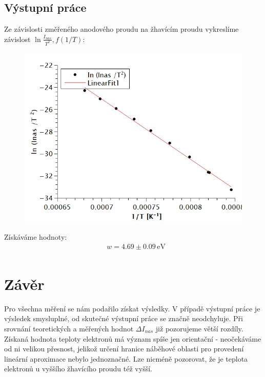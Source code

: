 \documentclass[czech,11pt,a4paper]{article}
\begin{document}
\begin{multicols}{2}
		\subsection{Výstupní práce}
		Ze závislosti změřeného anodového proudu na žhavícím proudu vykreslíme závislost $\ln \frac{I_{nas}}{T^2}, f(1/T)$:
			\begin{figure}[H]
			\centering
			\includegraphics[width=0.7\linewidth]{vystupniprace}
		\end{figure}
		Získáváme hodnoty:
		\begin{align*}
			& w = 4.69 \pm 0.09 \,\mathrm{eV}\\
		\end{align*}
		\section{Závěr}
		Pro všechna měření se nám podařilo získat výsledky. V případě výstupní práce je výsledek smysluplné, od skutečné výstupní práce se značně neodchyluje. Při srovnání teoretických a měřených hodnot $\Delta I_{nas}$ již pozorujeme větší rozdíly. \\ Získaná hodnota teploty elektronů má význam spíše jen orientační - neočekáváme od ni velikou přesnost, jelikož určení hranice náběhové oblasti pro provedení lineární aproximace nebylo jednoznačné. Lze nicméně pozorovat, že je teplota elektronů u vyššího žhavícího proudu též vyšší.
	
		

		
		
		
		
		
	\end{multicols}
\end{document}
